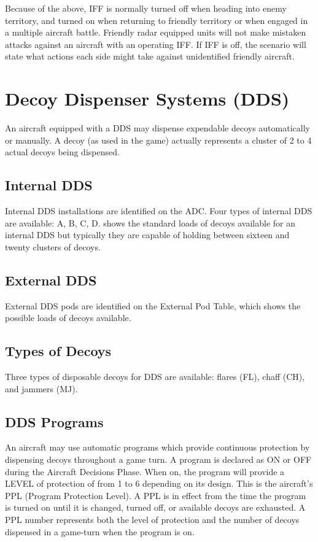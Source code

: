 \begin{advancedrules}
    Because of the above, IFF is normally turned off when heading into enemy territory, and turned on when returning to friendly territory or when engaged in a multiple aircraft battle. Friendly radar equipped units will not make mistaken attacks against an aircraft with an operating IFF. If IFF is off, the scenario will state what actions each side might take against unidentified friendly aircraft.


    \section{Decoy Dispenser Systems (DDS)}
    \label{rule:dds}

    An aircraft equipped with a DDS may dispense expendable decoys automatically or manually. A decoy (as used in the game) actually represents a cluster of 2 to 4 actual decoys being dispensed.


    \subsection{Internal DDS} Internal DDS installations are identified on the ADC. Four types of internal DDS are available: A, B, C, D.  shows the standard loads of decoys available for an internal DDS but typically they are capable of holding between sixteen and twenty clusters of decoys.

    \subsection{External DDS} External DDS pods are identified on the External Pod Table, which shows the possible loads of decoys available.

    \subsection{Types of Decoys} Three types of disposable decoys for DDS are available: flares (FL), chaff (CH), and jammers (MJ).

    \subsection{DDS Programs} An aircraft may use automatic programs which provide continuous protection by dispensing decoys throughout a game turn. A program is declared as ON or OFF during the Aircraft Decisions Phase. When on, the program will provide a LEVEL of protection of from 1 to 6 depending on its design. This is the aircraft's PPL (Program Protection Level). A PPL is in effect from the time the program is turned on until it is changed, turned off, or available decoys are exhausted. A PPL number represents both the level of protection and the number of decoys dispensed in a game-turn when the program is on.


\end{advancedrules}
